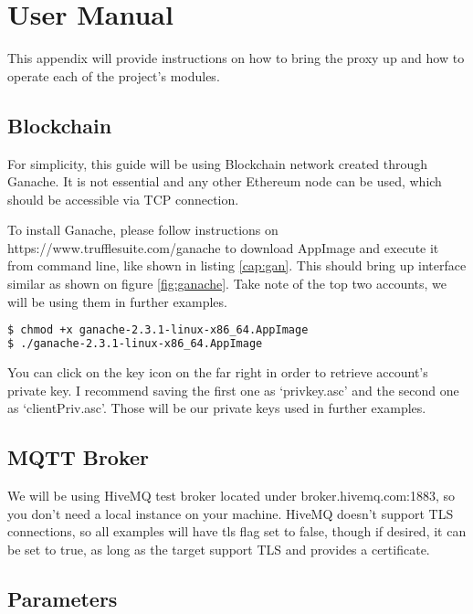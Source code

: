 \chapter{User Manual}\label{cha:manual}
This appendix will provide instructions on how to bring the proxy up and how to operate each of the project's modules.
\section{Blockchain}
For simplicity, this guide will be using Blockchain network created through Ganache. It is not essential and any other Ethereum node can be used, which should be accessible via TCP connection.

To install Ganache, please follow instructions on https://www.trufflesuite.com/ganache to download AppImage and execute it from command line, like shown in listing \ref{cap:gan}. This should bring up interface similar as shown on figure \ref{fig:ganache}. Take note of the top two accounts, we will be using them in further examples.

\begin{lstlisting}[language=bash,breaklines=true,label={cap:gan},caption={Launching Ganache}]
$ chmod +x ganache-2.3.1-linux-x86_64.AppImage
$ ./ganache-2.3.1-linux-x86_64.AppImage
\end{lstlisting}

You can click on the key icon on the far right in order to retrieve account's private key. I recommend saving the first one as `privkey.asc' and the second one as `clientPriv.asc'. Those will be our private keys used in further examples.
\section{MQTT Broker}
We will be using HiveMQ test broker located under broker.hivemq.com:1883, so you don't need a local instance on your machine. HiveMQ doesn't support TLS connections, so all examples will have tls flag set to false, though if desired, it can be set to true, as long as the target support TLS and provides a certificate.
\section{Parameters}
